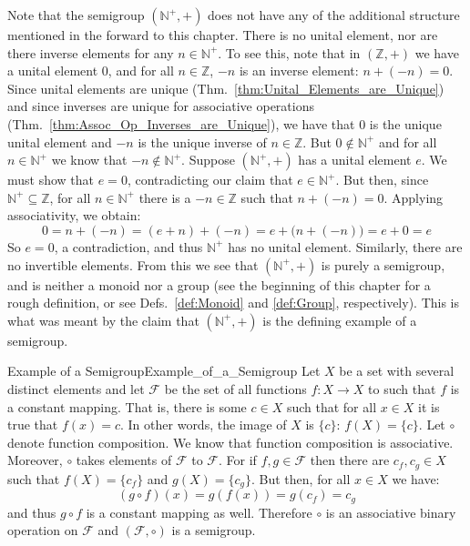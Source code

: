     Note that the semigroup $(\mathbb{N}^{+},+)$ does not have any of the
    additional structure mentioned in the forward to this chapter. There is no
    unital element, nor are there inverse elements for any $n\in\mathbb{N}^{+}$.
    To see this, note that in $(\mathbb{Z},+)$ we have a unital element 0, and
    for all $n\in\mathbb{Z}$, $\minus{n}$ is an inverse element:
    $n+(\minus{n})=0$. Since unital elements are unique
    (Thm.~\ref{thm:Unital_Elements_are_Unique}) and since inverses are unique
    for associative operations (Thm.~\ref{thm:Assoc_Op_Inverses_are_Unique}), we
    have that 0 is the unique unital element and $\minus{n}$ is the unique
    inverse of $n\in\mathbb{Z}$. But $0\notin\mathbb{N}^{+}$ and for all
    $n\in\mathbb{N}^{+}$ we know that $\minus{n}\notin\mathbb{N}^{+}$.
    Suppose $(\mathbb{N}^{+},+)$ has a unital element $e$. We must show that
    $e=0$, contradicting our claim that $e\in\mathbb{N}^{+}$. But then, since
    $\mathbb{N}^{+}\subseteq\mathbb{Z}$, for all $n\in\mathbb{N}^{+}$ there is
    a $\minus{n}\in\mathbb{Z}$ such that $n+(\minus{n})=0$. Applying
    associativity, we obtain:
    \begin{equation}
        0=n+(\minus{n})=(e+n)+(\minus{n})=e+\big(n+(\minus{n})\big)=e+0=e
    \end{equation}
    So $e=0$, a contradiction, and thus $\mathbb{N}^{+}$ has no unital
    element. Similarly, there are no invertible elements. From this we see that
    $(\mathbb{N}^{+},+)$ is purely a semigroup, and is neither a monoid nor a
    group (see the beginning of this chapter for a rough definition, or see
    Defs.~\ref{def:Monoid} and \ref{def:Group}, respectively). This is what was
    meant by the claim that $(\mathbb{N}^{+},+)$ is the defining example of a
    semigroup.
    \begin{fexample}{Example of a Semigroup}{Example_of_a_Semigroup}
        Let $X$ be a set with several distinct elements and let $\mathscr{F}$ be
        the set of all functions $f:X\rightarrow{X}$ to such that $f$ is a
        constant mapping. That is, there is some $c\in{X}$ such that for all
        $x\in{X}$ it is true that $f(x)=c$. In other words, the image of $X$ is
        $\{c\}$: $f(X)=\{c\}$. Let $\circ$ denote function composition. We know
        that function composition is associative. Moreover, $\circ$ takes
        elements of $\mathscr{F}$ to $\mathscr{F}$. For if $f,g\in\mathscr{F}$
        then there are $c_{f},c_{g}\in{X}$ such that $f(X)=\{c_{f}\}$ and
        $g(X)=\{c_{g}\}$. But then, for all $x\in{X}$ we have:
        \begin{equation}
            (g\circ{f})(x)=g(f(x))=g(c_{f})=c_{g}
        \end{equation}
        and thus $g\circ{f}$ is a constant mapping as well. Therefore $\circ$ is
        an associative binary operation on $\mathscr{F}$ and
        $(\mathscr{F},\circ)$ is a semigroup.
    \end{fexample}
